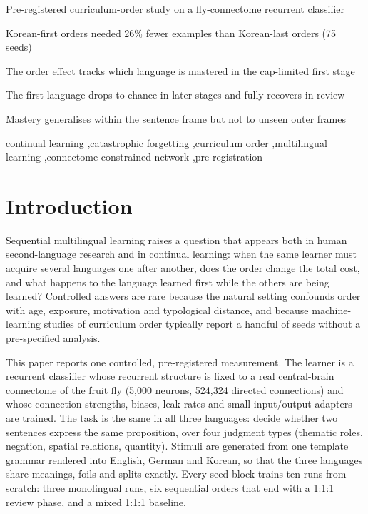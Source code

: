 \documentclass[preprint,12pt,authoryear]{elsarticle}
\begin{document}
\begin{frontmatter}
\begin{highlights}
\item Pre-registered curriculum-order study on a fly-connectome recurrent classifier
\item Korean-first orders needed 26\% fewer examples than Korean-last orders (75 seeds)
\item The order effect tracks which language is mastered in the cap-limited first stage
\item The first language drops to chance in later stages and fully recovers in review
\item Mastery generalises within the sentence frame but not to unseen outer frames
\end{highlights}

\begin{keyword}
continual learning \sep catastrophic forgetting \sep curriculum order \sep multilingual learning \sep connectome-constrained network \sep pre-registration
\end{keyword}

\end{frontmatter}

\linenumbers


\section{Introduction}

Sequential multilingual learning raises a question that appears both in human second-language research and in continual learning: when the same learner must acquire several languages one after another, does the order change the total cost, and what happens to the language learned first while the others are being learned? Controlled answers are rare because the natural setting confounds order with age, exposure, motivation and typological distance, and because machine-learning studies of curriculum order typically report a handful of seeds without a pre-specified analysis.

This paper reports one controlled, pre-registered measurement. The learner is a recurrent classifier whose recurrent structure is fixed to a real central-brain connectome of the fruit fly (5{,}000 neurons, 524{,}324 directed connections) and whose connection strengths, biases, leak rates and small input/output adapters are trained. The task is the same in all three languages: decide whether two sentences express the same proposition, over four judgment types (thematic roles, negation, spatial relations, quantity). Stimuli are generated from one template grammar rendered into English, German and Korean, so that the three languages share meanings, foils and splits exactly. Every seed block trains ten runs from scratch: three monolingual runs, six sequential orders that end with a 1:1:1 review phase, and a mixed 1:1:1 baseline.
\end{document}
